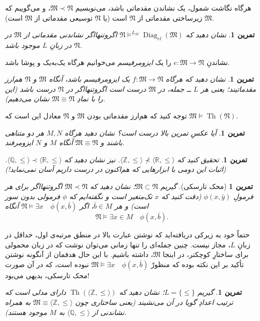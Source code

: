 \documentclass[12pt,a4paper]{article}
\theoremstyle{colorhead}
\newtheorem{tam}[thm]{تمرین}
\DeclareMathOperator{\Th}{Th}
\DeclareMathOperator{\diag}{Diag}
\begin{document}
هرگاه نگاشت شمول، یک نشاندن مقدماتی باشد، می‌نویسیم
$\mathfrak{M}\prec \mathfrak{N}$، 
و می‌گوییم که
$\mathfrak{M}$
زیرساختی مقدماتی از
$\mathfrak{N}$
است (یا 
$\mathfrak{N}$
توسیعی مقدماتی از
$\mathfrak{M}$
است).
\begin{tam}
نشان دهید که 
$\mathfrak{N}\models^{L_M} \diag_{el}(\mathfrak{M})$
اگروتنهااگر نشاندنی مقدماتی از
$\mathfrak{M}$
در 
$\mathfrak{N}$
در زبانِ
$L$
موجود باشد. 
\end{tam}
نشاندنِ
$e:\mathfrak{M}\to\mathfrak{N}$
را یک 
\textit{ایزومرفیسم }
می‌خوانیم هرگاه یک‌به‌یک و پوشا باشد.
\begin{tam}
نشان دهید که هرگاه
$f:\mathfrak{M}\to \mathfrak{N}$
یک ایزومرفیسم باشد، آنگاه 
$\mathfrak{M}$
و
$\mathfrak{N}$
هم‌ارز مقدماتیند؛ یعنی هر 
$L$ ــ
جمله، در
$\mathfrak{M}$
درست است اگروتنهااگر در
$\mathfrak{N}$
درست باشد (این را با نمادِ
$\mathfrak{M}\equiv \mathfrak{N}$
نشان می‌دهیم).
\end{tam}
توجه کنید که هم‌ارز مقدماتی بودن
$\mathfrak{M}$
و
$\mathfrak{N}$
معادل این است که
$\mathfrak{M}\models \Th(\mathfrak{N})$.
\begin{tam}
آيا عکسِ تمرین بالا درست است؟ نشان دهید هرگاه
$M,N$
هر دو متناهی باشند و
$\mathfrak{M}\equiv \mathfrak{N}$
آنگاه
$M$
و
$N$
ایزومرفند.
\end{tam}
\begin{tam}
تحقیق کنید که
$\langle \mathbb{Z},\leq\rangle \not\prec \langle \mathbb{R},\leq\rangle$.
نیز نشان دهید که
$\langle \mathbb{Q},\leq \rangle\prec \langle \mathbb{R},\leq\rangle$.
(اثبات این دومی با ابزارهایی که هم‌اکنون در درست داریم آسان نمی‌نماید!)
\end{tam}
\begin{tam}[محک تارسکی]
گیریم
$\mathfrak{M}\subset \mathfrak{N}$؛
نشان دهید که
$\mathfrak{M}\prec \mathfrak{N}$
اگروتنهااگر 
برای هر فرمولِ
$\phi(x,\bar{y})$
(دقت کنید که
$x$
تک‌متغیر است و نگفته‌ایم که 
$\phi$
فرمولی بدون سور است)
و هر
$\bar{b}\in M$،
اگر
$\mathfrak{N}\models \exists x \quad \phi(x,\bar{b})$
آنگاه
\[
\mathfrak{N}\models \exists x\in M \quad \phi(x,\bar{b}).
\]
\end{tam}
حتماً خود به زیرکی دریافته‌اید که نوشتن عبارت بالا در منطق مرتبه‌ی اول، حداقل در زبانِ
$L$،
مجاز نیست. چنین جمله‌ای را تنها زمانی می‌توان نوشت که 
در زبان محمولی برای ساختارِ کوچکتر، در اینجا
$\mathfrak{M}$،
داشته باشیم. با این حال هدفمان از آنگونه نوشتن تأکید بر این نکته بوده  که منظورْ 
$\mathfrak{M}\models \exists x \quad \phi(x,\bar{b})$
نبوده است، که در آن صورت محک تارسکی،‌ بدیهی می‌بود!
\begin{tam}
گیریم
$L=\{\leq\}$؛
نشان‌ دهید که
$\Th(\langle \mathbb{Z},\leq\rangle)$
دارای مدلی است که ترتیب اعدادِ گویا در آن می‌نشیند (یعنی 
ساختاری چون
$\mathfrak{M}\equiv \langle \mathbb{Z},\leq\rangle$
به همراه نشاندنی از 
$\langle \mathbb{Q},\leq\rangle$
به
$M$
موجود هستند).
\end{tam}
\end{document}

